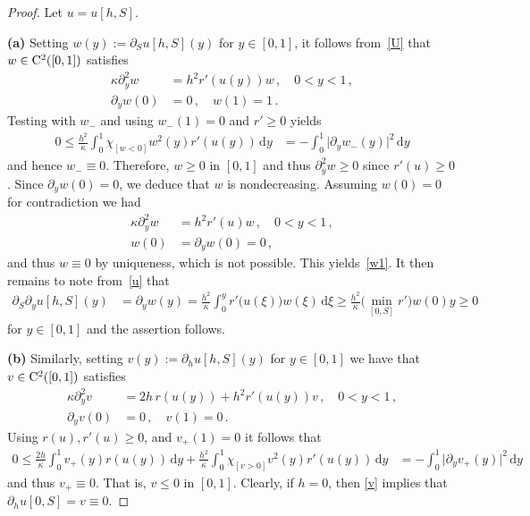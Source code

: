 \documentclass[reqno,11pt]{amsart}
\numberwithin{equation}{section}
\newcommand{\rd}{\mathrm{d}}
\begin{document}
\begin{proof}
Let $u=u[h,S]$. 


{\bf (a)} Setting $w(y):=\partial_S u[h,S](y)$ for $y\in [0,1]$, it follows from~\eqref{U} that $w\in {\rm C}^2([0,1])$ satisfies
\begin{align*}
\kappa \partial_{y}^2 w&= h^2r'(u(y))w\,, \quad 0<y<1\,,\\
\partial_{y}w(0)&=0\,,\quad w(1)=1\,. 
\end{align*}
Testing with $w_-$ and using $w_-(1)=0$ and $r'\ge 0$ yields
\begin{align*}
0\le\frac{ h^2}{\kappa}\int_0^1\chi_{[w<0]}w^2(y) r'(u(y))\,\rd y&=-\int_0^1\vert \partial_y w_-(y)\vert^2\,\rd y
\end{align*} 
and hence $w_-\equiv 0$. Therefore, $w\ge 0$ in $[0,1]$ and thus $\partial_y^2 w\ge 0$ since $r'(u)\ge 0$. Since $\partial_y w(0)=0$, we deduce that $w$ is nondecreasing. Assuming $w(0)=0$ for contradiction we had
\begin{align*}
\kappa \partial_{y}^2 w&= h^2r'(u)w\,, \quad 0<y<1\,,\\
w(0)&=\partial_{y}w(0)=0\,, 
\end{align*}
and thus $w\equiv 0$ by uniqueness, which is not possible. This yields~\eqref{w1}. It then remains to note from~\eqref{u} that
\begin{align*}
\partial_S\partial_y u[h,S](y)&=\partial_y w(y)=\frac{h^2}{\kappa}\int_0^y r'\big(u(\xi)\big) w(\xi)\,\rd \xi\ge
\frac{h^2}{\kappa}\big(\min_{[0,S]} r'\big) w(0) y\ge 0
\end{align*}
for $y\in [0,1]$ and the assertion follows.

{\bf (b)} Similarly, setting  $v(y):=\partial_h u[h,S](y)$ for $y\in [0,1]$ we have that $v\in {\rm C}^2([0,1])$ satisfies
\begin{subequations}\label{v}
\begin{align}
\kappa \partial_{y}^2 v&= 2h\, r(u(y))+h^2r'(u(y))v\,, \quad 0<y<1\,,\\
\partial_{y}v(0)&=0\,,\quad v(1)=0\,. 
\end{align}
\end{subequations}
Using $r(u), r'(u)\ge 0$, and $v_+(1)=0$ it follows that
\begin{align*}
0\le\frac{2h}{\kappa}\int_0^1 v_+(y) r(u(y))\,\rd y+ \frac{h^2}{\kappa}\int_0^1\chi_{[v>0]}v^2(y) r'(u(y))\,\rd y&=-\int_0^1\vert \partial_y v_+(y)\vert^2\,\rd y
\end{align*} 
and thus $v_+\equiv 0$. That is, $v\le 0$ in $[0,1]$. Clearly, if $h=0$, then \eqref{v} implies that $\partial_h u[0,S]=v\equiv 0$.
\end{proof}
\end{document}
